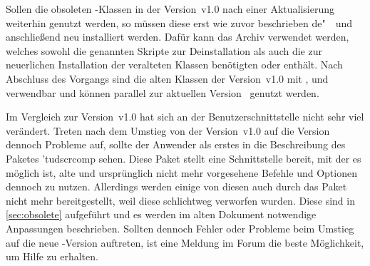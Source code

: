 Sollen die obsoleten \TUDScript-Klassen in der Version~v1.0 nach einer 
Aktualisierung weiterhin genutzt werden, so müssen diese erst wie zuvor 
beschrieben de"~~und anschließend neu installiert werden. Dafür kann das Archiv 
%
{} verwendet werden, welches sowohl die 
genannten Skripte zur Deinstallation als auch die zur neuerlichen Installation 
der veralteten Klassen benötigten  oder 
 enthält. Nach Abschluss des Vorgangs sind 
die alten Klassen der Version~v1.0 mit , 
 und  verwendbar und können 
parallel zur aktuellen Version~\vTUDScript{} genutzt werden.

Im Vergleich zur Version~v1.0 hat sich an der Benutzerschnittstelle nicht sehr 
viel verändert. Treten nach dem Umstieg von der Version~v1.0 auf die 
Version~\vTUDScript{} dennoch Probleme auf, sollte der Anwender als erstes in 
die Beschreibung des Paketes \Package'{tudscrcomp} sehen. Diese Paket stellt 
eine Schnittstelle bereit, mit der es möglich ist, alte und ursprünglich nicht 
mehr vorgesehene Befehle und Optionen dennoch zu nutzen. Allerdings werden 
einige von diesen auch durch das Paket  nicht mehr 
bereitgestellt, weil diese schlichtweg verworfen wurden. Diese sind in 
\autoref{sec:obsolete} aufgeführt und es werden im alten Dokument notwendige 
Anpassungen beschrieben. Sollten dennoch Fehler oder Probleme beim Umstieg auf 
die neue \TUDScript-Version auftreten, ist eine Meldung im Forum die beste 
Möglichkeit, um Hilfe zu erhalten.